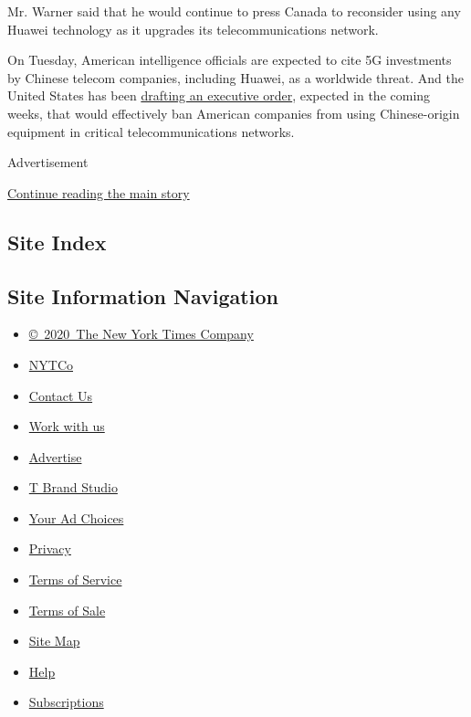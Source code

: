 Mr. Warner said that he would continue to press Canada to reconsider
using any Huawei technology as it upgrades its telecommunications
network.

On Tuesday, American intelligence officials are expected to cite 5G
investments by Chinese telecom companies, including Huawei, as a
worldwide threat. And the United States has been
\href{https://www.nytimes.com/2018/12/11/us/politics/trump-china-trade.html?module=inline}{drafting
an executive order}, expected in the coming weeks, that would
effectively ban American companies from using Chinese-origin equipment
in critical telecommunications networks.

Advertisement

\protect\hyperlink{after-bottom}{Continue reading the main story}

\hypertarget{site-index}{%
\subsection{Site Index}\label{site-index}}

\hypertarget{site-information-navigation}{%
\subsection{Site Information
Navigation}\label{site-information-navigation}}

\begin{itemize}
\tightlist
\item
  \href{https://help.nytimes.com/hc/en-us/articles/115014792127-Copyright-notice}{©~2020~The
  New York Times Company}
\end{itemize}

\begin{itemize}
\tightlist
\item
  \href{https://www.nytco.com/}{NYTCo}
\item
  \href{https://help.nytimes.com/hc/en-us/articles/115015385887-Contact-Us}{Contact
  Us}
\item
  \href{https://www.nytco.com/careers/}{Work with us}
\item
  \href{https://nytmediakit.com/}{Advertise}
\item
  \href{http://www.tbrandstudio.com/}{T Brand Studio}
\item
  \href{https://www.nytimes.com/privacy/cookie-policy\#how-do-i-manage-trackers}{Your
  Ad Choices}
\item
  \href{https://www.nytimes.com/privacy}{Privacy}
\item
  \href{https://help.nytimes.com/hc/en-us/articles/115014893428-Terms-of-service}{Terms
  of Service}
\item
  \href{https://help.nytimes.com/hc/en-us/articles/115014893968-Terms-of-sale}{Terms
  of Sale}
\item
  \href{https://spiderbites.nytimes.com}{Site Map}
\item
  \href{https://help.nytimes.com/hc/en-us}{Help}
\item
  \href{https://www.nytimes.com/subscription?campaignId=37WXW}{Subscriptions}
\end{itemize}
